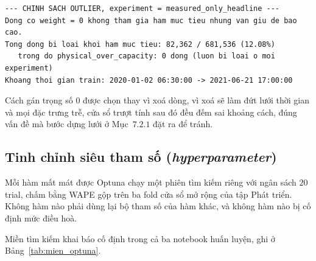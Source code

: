 \begingroup
\par{}\vspace{8pt}
\footnotesize\renewcommand{\baselinestretch}{1.0}\selectfont
\begin{verbatim}
--- CHINH SACH OUTLIER, experiment = measured_only_headline ---
Dong co weight = 0 khong tham gia ham muc tieu nhung van giu de bao cao.
Tong dong bi loai khoi ham muc tieu: 82,362 / 681,536 (12.08%)
   trong do physical_over_capacity: 0 dong (luon bi loai o moi experiment)
Khoang thoi gian train: 2020-01-02 06:30:00 -> 2021-06-21 17:00:00
\end{verbatim}
\par\vspace{8pt}
\endgroup
Cách gán trọng số $0$ được chọn thay vì xoá dòng, vì xoá sẽ làm đứt lưới thời gian và mọi đặc
trưng trễ, cửa sổ trượt tính sau đó đều đếm sai khoảng cách, đúng vấn đề mà bước dựng lưới ở
Mục~$7.2.1$ đặt ra để tránh.

\FloatBarrier
\subsection{Tinh chỉnh siêu tham số (\textit{hyperparameter})}

Mỗi hàm mất mát được Optuna chạy một phiên tìm kiếm riêng với ngân sách $20$ trial,
chấm bằng WAPE gộp trên ba fold cửa sổ mở rộng của tập Phát triển. Không hàm nào phải dùng lại
bộ tham số của hàm khác, và không hàm nào bị cố định mức điều hoà.

Miền tìm kiếm khai báo cố định trong cả ba notebook huấn luyện, ghi ở
Bảng~\ref{tab:mien_optuna}.


